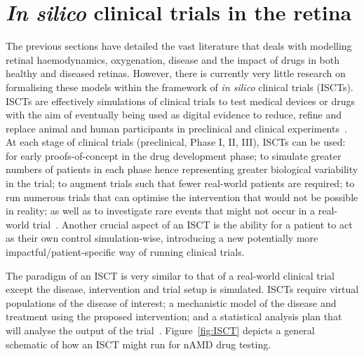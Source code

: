 \documentclass{article}
\begin{document}
\section{\textit{In silico} clinical trials in the retina}\label{sec:InSilicoTrials}

The previous sections have detailed the vast literature that deals with modelling retinal haemodynamics, oxygenation, disease and the impact of drugs in both healthy and diseased retinas. However, there is currently very little research on formalising these models within the framework of \textit{in silico} clinical trials (ISCTs). ISCTs are effectively simulations of clinical trials to test medical devices or drugs with the aim of eventually being used as digital evidence to reduce, refine and replace animal and human participants in preclinical and clinical experiments~\cite{Viceconti2021a}. At each stage of clinical trials (preclinical, Phase I, II, III), ISCTs can be used: for early proofs-of-concept in the drug development phase; to simulate greater numbers of patients in each phase hence representing greater biological variability in the trial; to augment trials such that fewer real-world patients are required; to run numerous trials that can optimise the intervention that would not be possible in reality; as well as to investigate rare events that might not occur in a real-world trial~\cite{Pappalardo2019, Viceconti_2016, Viceconti2017}. Another crucial aspect of an ISCT is the ability for a patient to act as their own control simulation-wise, introducing a new potentially more impactful/patient-specific way of running clinical trials.

The paradigm of an ISCT is very similar to that of a real-world clinical trial except the disease, intervention and trial setup is simulated. ISCTs require virtual populations of the disease of interest; a mechanistic model of the disease and treatment using the proposed intervention; and a statistical analysis plan that will analyse the output of the trial~\cite{Alfonso2020}. Figure~\ref{fig:ISCT} depicts a general schematic of how an ISCT might run for nAMD drug testing.
\end{document}
